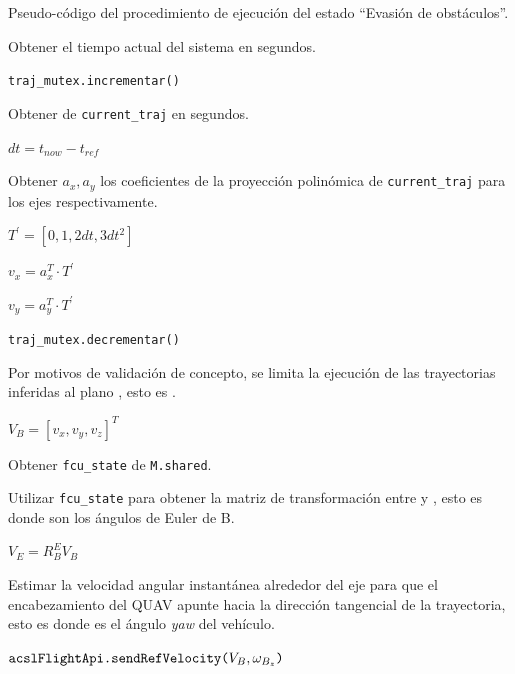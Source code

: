 \begin{algorithm}
\caption{Pseudo-código del procedimiento de ejecución del estado ``Evasión de obstáculos''. }
\label{alg:traj-execution}

Obtener el tiempo actual del sistema  en segundos.

\texttt{traj\_mutex.incrementar()}

Obtener  de \texttt{current\_traj} en segundos.

$dt = t_{now} - t_{ref}$


Obtener $a_x, a_y$ los coeficientes de la proyección polinómica de \texttt{current\_traj} para los ejes  respectivamente.

$T^\prime = [0, 1, 2dt, 3dt^2]$

$v_x = a_{x}^T \cdot T^\prime$

$v_y = a_{y}^T \cdot T^\prime$

\texttt{traj\_mutex.decrementar()}

Por motivos de validación de concepto, se limita la ejecución de las trayectorias inferidas al plano , esto es .

$V_{B} = [v_x, v_y, v_z]^T$

Obtener \texttt{fcu\_state} de \texttt{M.shared}.

Utilizar \texttt{fcu\_state} para obtener la matriz de transformación entre  y , esto es  donde \jim{\phi,\theta,\psi} son los ángulos de Euler de B. 

$V_{E} = R_{B}^{E} V_{B}$

Estimar la velocidad angular instantánea alrededor del eje  para que el encabezamiento del QUAV apunte hacia la dirección tangencial de la trayectoria, esto es  donde \jim{\psi} es el ángulo \textit{yaw} del vehículo.

$\text{\texttt{acslFlightApi.sendRefVelocity(}}V_{B}, \omega_{B_z}\text{\texttt{)}}$

\end{algorithm}

